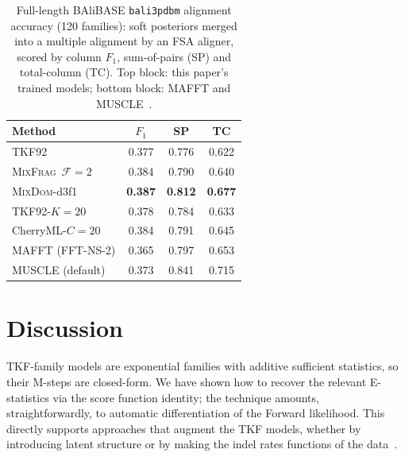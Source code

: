 \documentclass{article}
\newcommand{\MixFrag}{\textsc{MixFrag}}
\newcommand{\MixDom}{\textsc{MixDom}}
\begin{document}
\begin{table}[t]
\caption{Full-length BAliBASE
\texttt{bali3pdbm} alignment accuracy (120 families): soft posteriors
merged into a multiple alignment by an FSA aligner, scored by column
$F_1$, sum-of-pairs (SP) and total-column (TC). Top block: this paper's
trained models; bottom block: MAFFT and MUSCLE~\cite{Katoh2013,Edgar2004}.}
\label{tab:balibase}
\centering
\setlength{\tabcolsep}{5pt}
\begin{tabular}{@{}lccc@{}}
\toprule
Method & $F_1$ & SP & TC \\
\midrule
TKF92            & 0.377 & 0.776 & 0.622 \\
\MixFrag\ $\mathcal F{=}2$ & 0.384 & 0.790 & 0.640 \\
\MixDom-d3f1     & \textbf{0.387} & \textbf{0.812} & \textbf{0.677} \\
TKF92-$K{=}20$   & 0.378 & 0.784 & 0.633 \\
CherryML-$C{=}20$ & 0.384 & 0.791 & 0.645 \\
\midrule
MAFFT (FFT-NS-2) & 0.365 & 0.797 & 0.653 \\
MUSCLE (default) & 0.373 & 0.841 & 0.715 \\
\bottomrule
\end{tabular}
\end{table}

\section{Discussion}
\label{sec:discussion}

TKF-family models are exponential families with additive sufficient
statistics, so their M-steps are closed-form.
We have shown how to recover the relevant E-statistics via the score function identity;
the technique amounts, straightforwardly, to automatic differentiation of the Forward likelihood.
This directly supports approaches that augment the TKF models, whether by introducing latent structure
or by making the indel rates functions of the data~\cite{LargeHolmes2026}.

\end{document}
